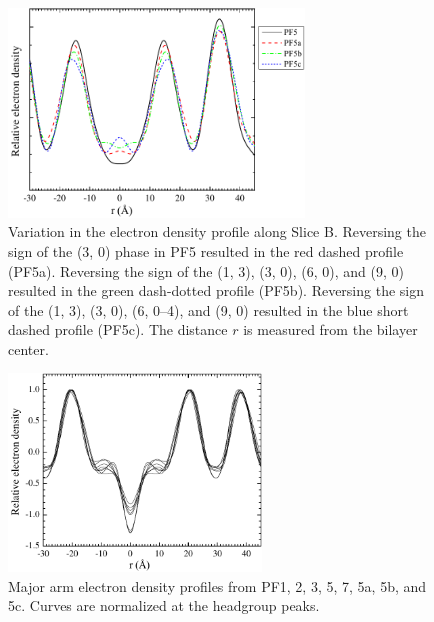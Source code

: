 \begin{figure}[htbp]
  \centering
  \includegraphics[width=0.7\textwidth]{figures/ripple/LAXS/minor_phase_variation}
  \caption{Variation in the electron density profile along Slice B.
  Reversing the sign of the (3, 0) phase in PF5 
  resulted in the red dashed profile (PF5a). Reversing the sign of the 
  (1, 3), (3, 0), (6, 0), and (9, 0) resulted in the green dash-dotted profile
  (PF5b). Reversing the sign of the (1, 3), (3, 0), (6, 0--4), and (9, 0)
  resulted in the blue short dashed profile (PF5c). 
  The distance $r$ is measured from the bilayer center.}
  \label{fig:minor_phase_variation}
\end{figure}

\begin{figure}[htbp]
  \centering
  \includegraphics[width=0.6\textwidth]{figures/ripple/LAXS/major_arm_overlay}
  \caption{Major arm electron density profiles from PF1, 2, 3, 5, 7, 
  5a, 5b, and 5c. Curves are normalized at the headgroup peaks.}
  \label{fig:major_arm_overlay}
\end{figure}

